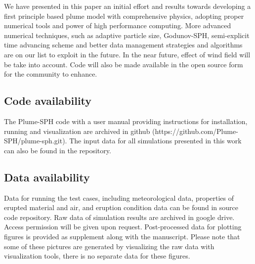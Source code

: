 \documentclass[journal abbreviation, manuscript]{copernicus}
\begin{document}
We have presented in this paper an initial effort and results towards developing a first principle based plume model with comprehensive physics, adopting proper numerical tools and power of high performance computing. More advanced numerical techniques, such as adaptive particle size, Godunov-SPH, semi-explicit time advancing scheme and better data management strategies and algorithms are on our list to exploit in the future.   In the near future, effect of wind field will be take into account. Code will also be made available in the open source form for the community to enhance.

\subsection{Code availability}
The Plume-SPH code with a user manual providing instructions for installation, running and visualization are archived in github (https://github.com/Plume-SPH/plume-sph.git). The input data for all simulations presented in this work can also be found in the repository.

\subsection{Data availability}
Data for running the test cases, including meteorological data, properties of erupted material and air, and eruption condition data can be found in source code repository. Raw data of simulation results are archived in google drive. Access permission will be given upon request. Post-processed data for plotting figures is provided as supplement along with the manuscript. Please note that some of these pictures are generated by visualizing the raw data with visualization tools, there is no separate data for these figures.
%
%
%
\end{document}
